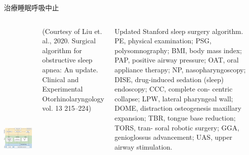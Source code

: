 \documentclass[aspectratio=169]{beamer}
\begin{document}
\begin{frame}{治療睡眠呼吸中止}
\begin{columns}[onlytextwidth]


    \includegraphics[height = 12cm]{ceo-2020-01053f6.jpg}
    \par (Courtesy of Liu et. al., 2020. Surgical algorithm for obstructive sleep apnea: An update. Clinical and Experimental Otorhinolaryngology vol. 13 215–224)

    \par Updated Stanford sleep surgery algorithm. PE, physical examination; PSG, polysomnography; BMI, body mass index; PAP, positive airway pressure; OAT, oral appliance therapy; NP, nasopharyngoscopy; DISE, drug-induced sedation (sleep) endoscopy; CCC, complete con- centric collapse; LPW, lateral pharyngeal wall; DOME, distraction osteogenesis maxillary expansion; TBR, tongue base reduction; TORS, tran- soral robotic surgery; GGA, genioglossus advancement; UAS, upper airway stimulation.\\
\end{columns}


\end{frame}
\end{document}
